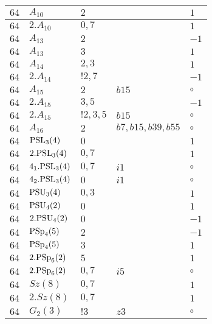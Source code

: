\documentclass[a4paper, 11pt]{article}
\begin{document}
\begin{longtable}{lllll}
        $ 64 $ & $ A_{10} $ & $ 2 $ & $ ~ $ & $ 1$ \\ \hline
        $ 64 $ & $ 2.A_{10} $ & $ 0,7 $ & $ ~ $ & $ 1$ \\ \hline
        $ 64 $ & $ A_{13} $ & $ 2 $ & $ ~ $ & $ -1$ \\ \hline
        $ 64 $ & $ A_{13} $ & $ 3 $ & $ ~ $ & $ 1$ \\ \hline
        $ 64 $ & $ A_{14} $ & $ 2,3 $ & $ ~ $ & $ 1$ \\ \hline
        $ 64 $ & $ 2.A_{14} $ & $ ! 2,7 $ & $ ~ $ & $ -1$ \\ \hline
        $ 64 $ & $ A_{15} $ & $ 2 $ & $ b15 $ &  $\circ$ \\ \hline
        $ 64 $ & $ 2.A_{15} $ & $ 3, 5 $ & $ ~ $ & $ -1$ \\ \hline
        $ 64 $ & $ 2.A_{15} $ & $ ! 2,3,5 $ & $ b15 $ &  $\circ$ \\ \hline
        $ 64 $ & $ A_{16} $ & $ 2 $ & $ b7, b15, b39, b55 $ &  $\circ$ \\ \hline
        $ 64 $ & $ {\rm PSL}_{3}(4) $ & $ 0 $ & $ ~ $ & $ 1$ \\ \hline
        $ 64 $ & $ 2.{\rm PSL}_{3}(4) $ & $ 0,7 $ & $ ~ $ & $ 1$ \\ \hline
        $ 64 $ & $ 4_1.{\rm PSL}_{3}(4) $ & $ 0,7 $ & $ i1 $ &  $\circ$ \\ \hline
        $ 64 $ & $ 4_2.{\rm PSL}_{3}(4) $ & $ 0 $ & $ i1 $ &  $\circ$ \\ \hline
        $ 64 $ & $ {\rm PSU}_{3}(4) $ & $ 0,3 $ & $ ~ $ & $ 1$ \\ \hline
        $ 64 $ & $ {\rm PSU}_{4}(2) $ & $ 0 $ & $ ~ $ & $ 1$ \\ \hline
        $ 64 $ & $ 2.{\rm PSU}_{4}(2) $ & $ 0 $ & $ ~ $ & $ -1$ \\ \hline
        $ 64 $ & $ {\rm PSp}_{4}(5) $ & $ 2 $ & $ ~ $ & $ -1$ \\ \hline
        $ 64 $ & $ {\rm PSp}_{4}(5) $ & $ 3 $ & $ ~ $ & $ 1$ \\ \hline
        $ 64 $ & $ 2.{\rm PSp}_{6}(2) $ & $ 5 $ & $ ~ $ & $ 1$ \\ \hline
        $ 64 $ & $ 2.{\rm PSp}_{6}(2) $ & $ 0,7 $ & $ i5 $ &  $\circ$ \\ \hline
        $ 64 $ & $ Sz(8) $ & $ 0,7 $ & $ ~ $ & $ 1$ \\ \hline
        $ 64 $ & $ 2.Sz(8) $ & $ 0,7 $ & $ ~ $ & $ 1$ \\ \hline
        $ 64 $ & $ G_{2}(3) $ & $ ! 3 $ & $ z3 $ &  $\circ$ \\ \hline

\end{longtable}
\end{document}
